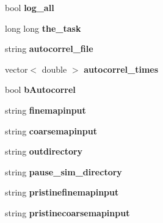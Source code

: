 \begin{DoxyCompactItemize}
\item 
bool {\bfseries log\+\_\+all}\hypertarget{class_tree_aada408975aa28b8992e98709d6c376fb}{}\label{class_tree_aada408975aa28b8992e98709d6c376fb}

\item 
long long {\bfseries the\+\_\+task}\hypertarget{class_tree_a9f74137d5c9c5529ec9a06f88dfa6960}{}\label{class_tree_a9f74137d5c9c5529ec9a06f88dfa6960}

\item 
string {\bfseries autocorrel\+\_\+file}\hypertarget{class_tree_a4713ae4a4068fa911bc346b594bbade6}{}\label{class_tree_a4713ae4a4068fa911bc346b594bbade6}

\item 
vector$<$ double $>$ {\bfseries autocorrel\+\_\+times}\hypertarget{class_tree_acbf9101bb6c28d5a0f174801c27c23b6}{}\label{class_tree_acbf9101bb6c28d5a0f174801c27c23b6}

\item 
bool {\bfseries b\+Autocorrel}\hypertarget{class_tree_aa4e3e77ce6b3fdbab72270144e63345a}{}\label{class_tree_aa4e3e77ce6b3fdbab72270144e63345a}

\item 
string {\bfseries finemapinput}\hypertarget{class_tree_a87e08c5f970f699a1d4c2a4abb00eb4e}{}\label{class_tree_a87e08c5f970f699a1d4c2a4abb00eb4e}

\item 
string {\bfseries coarsemapinput}\hypertarget{class_tree_af5e636fe4eb845d4c7b1a8a15e837c82}{}\label{class_tree_af5e636fe4eb845d4c7b1a8a15e837c82}

\item 
string {\bfseries outdirectory}\hypertarget{class_tree_a70b8a86ec0b71a04b4a26061bcaeb4a3}{}\label{class_tree_a70b8a86ec0b71a04b4a26061bcaeb4a3}

\item 
string {\bfseries pause\+\_\+sim\+\_\+directory}\hypertarget{class_tree_a504a4d7ae23146fd6236baa59da51a6e}{}\label{class_tree_a504a4d7ae23146fd6236baa59da51a6e}

\item 
string {\bfseries pristinefinemapinput}\hypertarget{class_tree_a3ef73c700c06c9ebab564cc9ec9fc4ab}{}\label{class_tree_a3ef73c700c06c9ebab564cc9ec9fc4ab}

\item 
string {\bfseries pristinecoarsemapinput}\hypertarget{class_tree_aab9168e35202fe02d4ef82087530a3bf}{}\label{class_tree_aab9168e35202fe02d4ef82087530a3bf}


\end{DoxyCompactItemize}
